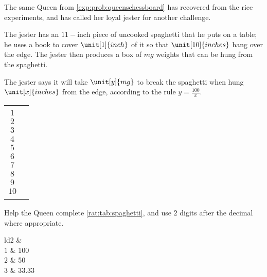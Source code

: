 \begin{problem}
The same Queen from \vref{exp:prob:queenschessboard} has recovered from
the rice experiments, and has called her loyal jester for another challenge.

The jester has an $11-$inch piece of uncooked spaghetti that he puts on a table;
he uses a book to cover $\unit[1]{inch}$ of it so that
$\unit[10]{inches}$ hang over the edge. The jester then produces a box of $\unit{mg}$
weights that can be hung from the spaghetti.

The jester says it will take $\unit[y]{mg}$ to break the spaghetti when hung
$\unit[x]{inches}$ from the edge, according to the rule $y=\frac{100}{x}$.
\begin{margintable}
	\centering
	\label{rat:tab:spaghetti}
	\begin{tabular}{cc}
		\beforeheading
		\heading{$x$} & \heading{$y$} \\
		\afterheading
		$1$           &               \\\normalline
		$2$           &               \\\normalline
		$3$           &               \\\normalline
		$4$           &               \\\normalline
		$5$           &               \\\normalline
		$6$           &               \\\normalline
		$7$           &               \\\normalline
		$8$           &               \\\normalline
		$9$           &               \\\normalline
		$10$          &               \\\lastline
	\end{tabular}
\end{margintable}
\begin{subproblem}\label{rat:prob:spaggt1}
	Help the Queen complete \cref{rat:tab:spaghetti}, and use $2$ digits after the decimal
	where appropriate.
	\begin{shortsolution}
		\begin{tabular}[t]{ld{2}}
			\beforeheading
			 & \heading{$y$} \\
			\afterheading
			$1$           & 100           \\\normalline
			$2$           & 50            \\\normalline
			$3$           & 33.33         \\\normalline

\end{tabular}
\end{shortsolution}
\end{subproblem}
\end{problem}
